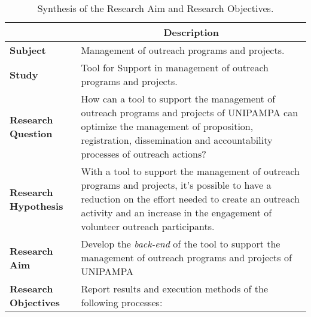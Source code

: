\begin{table}[!htb]
  \centering
  \caption{Synthesis of the Research Aim and Research Objectives.}
  \label{tbl:tableObjectives}
  \footnotesize
  \begin{tabular}{l|p{11cm}}
    \bottomrule
    \rowcolor[rgb]{0.749,0.749,0.749} \multicolumn{1}{c|}{\textbf{Topic}}                  & \multicolumn{1}{c}{\textbf{Description}}                                                                                                                                                                                             \\
    \hline
    \rowcolor[rgb]{0.898,0.898,0.898} \textcolor[rgb]{0.145,0.145,0.145}{\textbf{Subject}} & Management of outreach programs and projects.                                                                                                                                                                                        \\
    \textbf{Study}                                                                         & Tool for Support in management of outreach programs and projects.                                                                                                                                                                    \\
    \rowcolor[rgb]{0.898,0.898,0.898} \textbf{Research Question}                           & How can a tool to support the management of outreach programs and projects of \acs{UNIPAMPA} can optimize the management of proposition, registration, dissemination and accountability processes of outreach actions?               \\
    \textcolor[rgb]{0.145,0.145,0.145}{\textbf{Research Hypothesis}}                       & With a tool to support the management of outreach programs and projects, it's possible to have a reduction on the effort needed to create an outreach activity and an increase in the engagement of volunteer outreach participants. \\
    \rowcolor[rgb]{0.898,0.898,0.898} \textbf{Research Aim}                                & Develop the \textit{back-end} of the tool to support the management of outreach programs and projects of \acs{UNIPAMPA}                                                                                                                       \\
    \textbf{Research Objectives}                                                           & Report results and execution methods of the following processes:

\end{tabular}
\end{table}
